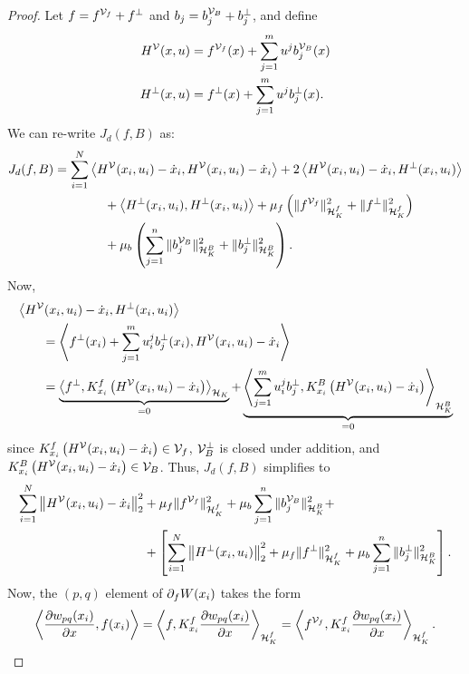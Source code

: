 \begin{proof}
Let $f = f^{\mathcal{V}_{f}} + f^{\perp}$ and $b_j = b_{j}^{\mathcal{V}_{B}} + b_{j}^\perp$, and define 
\[
	\begin{split}
	H^{\mathcal{V}}(x,u) &= f^{\mathcal{V}_{f}}(x) + \sum_{j=1}^{m} u^j b_j^{\mathcal{V}_{B}} (x) \\ 
	H^{\perp}(x,u) &= f^{\perp}(x) + \sum_{j=1}^{m} u^j b_j ^\perp (x).
	\end{split}
\]
We can re-write $J_d(f,B)$ as:
\[
\begin{split}
	J_d(f,B) &= \sum_{i=1}^{N} \left\langle H^{\mathcal{V}} (x_i, u_i) - \dot{x}_i,  H{^{\mathcal{V}}} (x_i,u_i) - \dot{x}_i \right\rangle + 2\left\langle H^{\mathcal{V}} (x_i, u_i) - \dot{x}_i, H^\perp (x_i,u_i) \right\rangle  \\
	&\qquad \qquad + \left\langle H^\perp(x_i, u_i), H^\perp(x_i, u_i) \right\rangle +  \mu_f \left( \|f^{\mathcal{V}_{f}}\|_{\mathcal{H}_{K}^f}^2 + \|f^\perp \|_{\mathcal{H}_{K}^f}^2 \right)  \\
	&\qquad \qquad + \mu_b \left( \sum_{j=1}^{n} \|b_j^{\mathcal{V}_{B}} \|_{\mathcal{H}_K^B}^2 + \|b_j^\perp \|_{\mathcal{H}_K^B}^2 \right). \\
\end{split}
\]
Now, 
\[
	\begin{split}
	&\left\langle H^{\mathcal{V}} (x_i, u_i) - \dot{x}_i, H^\perp (x_i,u_i) \right\rangle  \\
				&\qquad = \left\langle f^\perp (x_i) + \sum_{j=1}^{m} u_i^j b_j^\perp(x_i), H^{\mathcal{V}} (x_i, u_i) - \dot{x}_i \right\rangle \\
				&\qquad = \underbrace{\left\langle f^\perp, K_{x_i}^f \left(H^{\mathcal{V}} (x_i, u_i) - \dot{x}_i \right) \right\rangle_{\mathcal{H}_{K}}}_{=0} + \underbrace{\left\langle \sum_{j=1}^{m} u_i^j b_j^\perp, K^B_{x_i} \left(H^{\mathcal{V}} (x_i, u_i) - \dot{x}_i \right) \right\rangle_{\mathcal{H}_K^B}}_{=0} 
	\end{split}
\]
since $K_{x_i}^f \left(H^{\mathcal{V}} (x_i, u_i) - \dot{x}_i \right) \in \mathcal{V}_{f}$, $\mathcal{V}_{B}^\perp$ is closed under addition, and $K^B_{x_i} \left(H^{\mathcal{V}} (x_i, u_i) - \dot{x}_i \right) \in \mathcal{V}_{B}$. Thus, $J_d(f,B)$ simplifies to
\begin{equation}
\begin{split}
	\sum_{i=1}^{N} \left\| H^{\mathcal{V}} (x_i, u_i) - \dot{x}_i \right\|_2^2 &+ \mu_f  \|f^{\mathcal{V}_{f}}\|_{\mathcal{H}_{K}^f}^2 + \mu_b \sum_{j=1}^{n} \|b_j^{\mathcal{V}_{B}} \|_{\mathcal{H}_{K}^B}^2  + \\
	&+\left[ \sum_{i=1}^{N}  \left\| H^\perp (x_i, u_i) \right\|_2^2 +  \mu_f \|f^\perp \|_{\mathcal{H}_{K}^f}^2  + \mu_b\sum_{j=1}^{n}  \|b_j^\perp \|_{\mathcal{H}_{K}^B}^2 \right].
\end{split}
\label{obj_simp}
\end{equation}
Now, the $(p,q)$ element of $\partial_f W(x_i)$ takes the form 
\[
	\left\langle  \frac{ \partial w_{pq} (x_i)}{\partial x}, f (x_i) \right\rangle = \left\langle f, K_{x_i}^f\frac{ \partial w_{pq} (x_i)}{\partial x} \right\rangle_{\mathcal{H}_{K}^f} =  \left\langle f^{\mathcal{V}_{f}}, K^f_{x_i}\frac{ \partial w_{pq} (x_i)}{\partial x} \right\rangle_{\mathcal{H}_{K}^f}.
\]
\end{proof}
